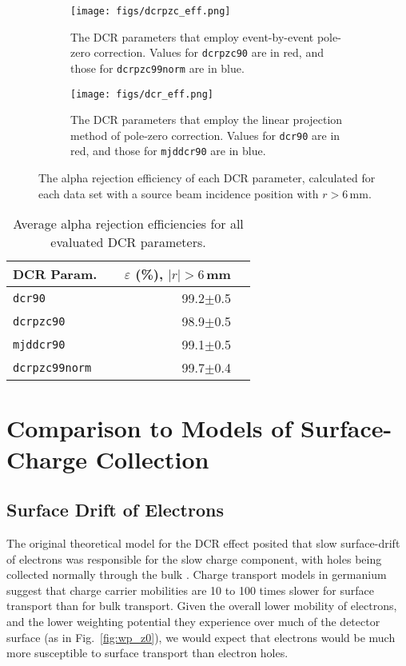 \documentclass[groupedaddress,rmp,amsmath,amssymb,bibnotes,altaffilletter,twocolumn]{revtex4-1}
\begin{document}
\begin{figure*}[]
 \centering
 \begin{subfigure}{.45\textwidth}
 \texttt{[image: figs/dcrpzc\_eff.png]}
 \caption{The DCR parameters that employ event-by-event pole-zero correction. Values for {\tt dcrpzc90} are in red, and those for {\tt dcrpzc99norm} are in blue.} 
 \end{subfigure}
  \begin{subfigure}{.45\textwidth}
 \texttt{[image: figs/dcr\_eff.png]}
 \caption{The DCR parameters that employ the linear projection method of pole-zero correction. Values for {\tt dcr90} are in red, and those for {\tt mjddcr90} are in blue.} 
 \end{subfigure}
 \caption{The alpha rejection efficiency of each DCR parameter, calculated for each data set with a source beam incidence position with $r>6$\,mm.}
 \label{fig:eff_allR}
\end{figure*}

\begin{table}[]
\begin{center}
\begin{tabular}{l r r}
DCR Param. & ~~$\varepsilon$ (\%), $|r|>6$\,mm \\  \hline
{\tt dcr90} & 99.2$\pm$0.5  \\
{\tt dcrpzc90} & 98.9$\pm$0.5  \\
{\tt mjddcr90} & 99.1$\pm$0.5  \\
{\tt dcrpzc99norm} &  99.7$\pm$0.4 \\
\end{tabular}
\caption{Average alpha rejection efficiencies for all evaluated DCR parameters.} \label{tab:avgEff}
\end{center}
\end{table}

\section{Comparison to Models of Surface-Charge Collection}
\subsection{Surface Drift of Electrons}
The original theoretical model for the DCR effect posited that slow surface-drift of electrons was responsible for the slow charge component, with holes being collected normally through the bulk \cite{Neutrino16}. Charge transport models in germanium \cite{Mullowney2012} suggest that charge carrier mobilities are 10 to 100 times slower for surface transport than for bulk transport. Given the overall lower mobility of electrons, and the lower weighting potential they experience over much of the detector surface (as in Fig.~\ref{fig:wp_z0}), we would expect that electrons would be much more susceptible to surface transport than electron holes. 
\end{document}
